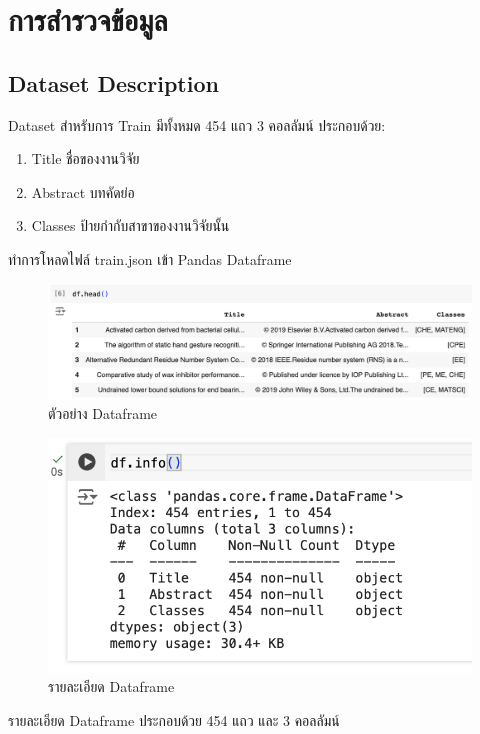 \chapter{การสำรวจข้อมูล}
\section{Dataset Description}
Dataset สำหรับการ Train มีทั้งหมด 454 แถว 3 คอลลัมน์ ประกอบด้วย:
\begin{enumerate}
    \item Title ชื่อของงานวิจัย
    \item Abstract บทคัดย่อ
    \item Classes ป้ายกำกับสาขาของงานวิจัยนั้น
\end{enumerate}

ทำการโหลดไฟล์ train.json เข้า Pandas Dataframe
\begin{figure}[ht]
    \centering
    \includegraphics[width=\imgwidth]
    {images/dataframe_head.jpg}
    \caption{ตัวอย่าง Dataframe}
    \label{fig:dataframe_head}
\end{figure}
\clearpage


\begin{figure}
    \centering
    \includegraphics[width=\imgwidth]
    {images/dataframe_info.jpg}
    \caption{รายละเอียด Dataframe}
    \label{fig:dataframe_info}
\end{figure}
รายละเอียด Dataframe ประกอบด้วย 454 แถว และ 3 คอลลัมน์
